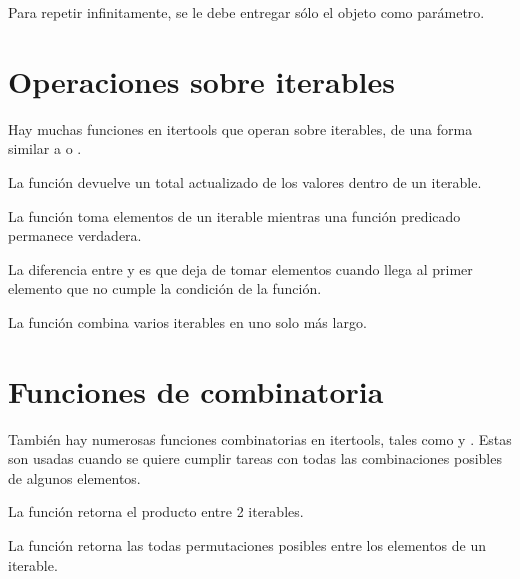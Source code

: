 Para repetir infinitamente, se le debe entregar sólo el objeto como parámetro.


\section{Operaciones sobre iterables}

Hay muchas funciones en itertools que operan sobre iterables, de una forma similar a  o .

La función  devuelve un total actualizado de los valores dentro de un iterable.


La función  toma elementos de un iterable mientras una función predicado permanece verdadera.


La diferencia entre  y  es que  deja de tomar elementos cuando llega al primer elemento que no cumple la condición de la función.


La función  combina varios iterables en uno solo más largo.


\section{Funciones de combinatoria}

También hay numerosas funciones combinatorias en itertools, tales como  y .
Estas son usadas cuando se quiere cumplir tareas con todas las combinaciones posibles de algunos elementos.

La función  retorna el producto entre 2 iterables.


La función  retorna las todas permutaciones posibles entre los elementos de un iterable.

